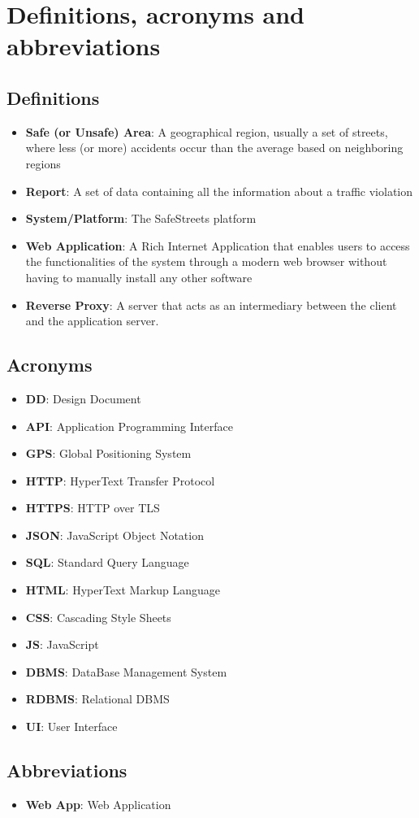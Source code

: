 \section{Definitions, acronyms and abbreviations}

\subsection{Definitions}
\begin{itemize}
  \item \textbf{Safe (or Unsafe) Area}: A geographical region, usually a set of streets, where less (or more) accidents occur than the average based on neighboring regions
  \item \textbf{Report}: A set of data containing all the information about a traffic violation
  \item \textbf{System/Platform}: The SafeStreets platform
  \item \textbf{Web Application}: A Rich Internet Application that enables users to access the functionalities of the system through a modern web browser without having to manually install any other software
  \item \textbf{Reverse Proxy}: A server that acts as an intermediary between the client and the application server.
\end{itemize}

\subsection{Acronyms}
\begin{itemize}
  \item \textbf{DD}: Design Document
  \item \textbf{API}: Application Programming Interface
  \item \textbf{GPS}: Global Positioning System
  \item \textbf{HTTP}: HyperText Transfer Protocol
  \item \textbf{HTTPS}: HTTP over TLS
  \item \textbf{JSON}: JavaScript Object Notation
  \item \textbf{SQL}: Standard Query Language
  \item \textbf{HTML}: HyperText Markup Language
  \item \textbf{CSS}: Cascading Style Sheets
  \item \textbf{JS}: JavaScript
  \item \textbf{DBMS}: DataBase Management System
  \item \textbf{RDBMS}: Relational DBMS
  \item \textbf{UI}: User Interface
\end{itemize}

\subsection{Abbreviations}
\begin{itemize}
  \item \textbf{Web App}: Web Application
\end{itemize}